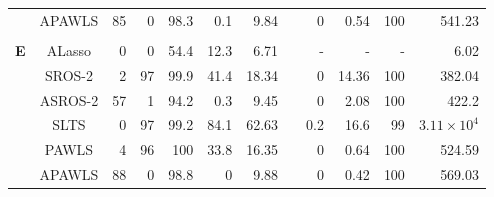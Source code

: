 \documentclass{article}\usepackage[]{graphicx}\usepackage[]{color}
\begin{document}
\begin{table}[thp]
\begin{center}
\begin{tabular}{ccrrrrrrrrrr}
	      & APAWLS & 85 & 0 & 98.3 
	      & 0.1 & 9.84 & & 0 
	      & 0.54 & 100 & 541.23\\
	      
	      \\
	       	  \multirow{8}{*}{{\bf E}}
	    	      & ALasso & 0 & 0 & 54.4 
	      & 12.3 & 6.71 & & -& - & - &  6.02\\
	      
	       & SROS-2 & 2 & 97 & 99.9 
	      & 41.4 & 18.34 & & 0 
	      & 14.36 & 100 & 382.04\\
	      
	      & ASROS-2 & 57 & 1 & 94.2 
	      & 0.3 & 9.45 & & 0 
	      & 2.08 & 100 & 422.2\\
	      
	      
	       & SLTS & 0 & 97 & 99.2 
	      & 84.1 & 62.63 & & 0.2 
	      & 16.6 & 99 & \ensuremath{3.11\times 10^{4}}\\
	      
	      & PAWLS & 4 & 96 & 100 
	      & 33.8 & 16.35 & & 0 
	      & 0.64 & 100 & 524.59\\
	      
	      & APAWLS & 88 & 0 & 98.8 
	      & 0 & 9.88 & & 0 
	      & 0.42& 100 & 569.03\\
	      
	   \hline\hline
	
	\end{tabular}
	\end{center}
	\end{table}
	
\end{document}
